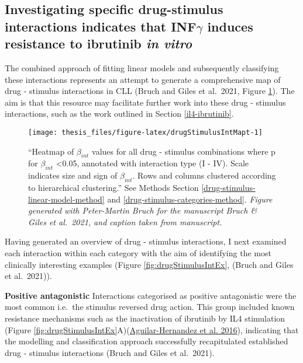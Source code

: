 \documentclass[11pt, a4paper, twosided]{book}
\begin{document}
\hypertarget{drug-stimulus-interaction-examples}{%
\subsection{\texorpdfstring{Investigating specific drug-stimulus interactions indicates that INF\(\gamma\) induces resistance to ibrutinib \emph{in vitro}}{Investigating specific drug-stimulus interactions indicates that INF\textbackslash gamma induces resistance to ibrutinib in vitro}}\label{drug-stimulus-interaction-examples}}

The combined approach of fitting linear models and subsequently classifying these interactions represents an attempt to generate a comprehensive map of drug - stimulus interactions in CLL (Bruch and Giles et al.~2021, Figure \ref{fig:drugStimulusIntMapt}). The aim is that this resource may facilitate further work into these drug - stimulus interactions, such as the work outlined in Section \ref{il4-ibrutinib}.


\begin{figure}

{\centering \texttt{[image: thesis\_files/figure-latex/drugStimulusIntMapt-1]} 

}

\caption{``Heatmap of \(\beta_{int}\) values for all drug - stimulus combinations where p for \(\beta_{int}\) \textless0.05, annotated with interaction type (I - IV). Scale indicates size and sign of \(\beta_{int}\). Rows and columns clustered according to hierarchical clustering.'' See Methods Section \ref{drug-stimulus-linear-model-method} and \ref{drug-stimulus-categories-method}. \emph{Figure generated with Peter-Martin Bruch for the manuscript Bruch \& Giles et al.~2021, and caption taken from manuscript.}}\label{fig:drugStimulusIntMapt}
\end{figure}
Having generated an overview of drug - stimulus interactions, I next examined each interaction within each category with the aim of identifying the most clinically interesting examples (Figure \ref{fig:drugStimulusIntEx}, (Bruch and Giles et al.~2021)).

\textbf{Positive antagonistic} Interactions categorised as positive antagonistic were the most common i.e.~the stimulus reversed drug action. This group included known resistance mechanisms such as the inactivation of ibrutinib by IL4 stimulation (Figure \ref{fig:drugStimulusIntEx}A)(\protect\hyperlink{ref-AguilarHernandez2016}{Aguilar-Hernandez et al. 2016}), indicating that the modelling and classification approach successfully recapitulated established drug - stimulus interactions (Bruch and Giles et al.~2021).
\end{document}
